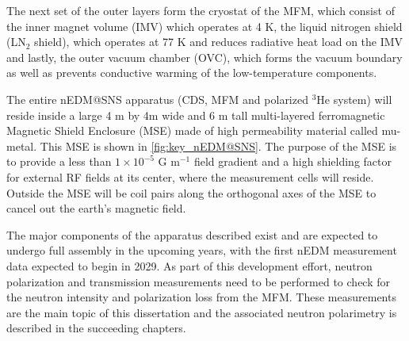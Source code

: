 
The next set of the outer layers form the cryostat of the MFM, which consist of the inner magnet volume (IMV) which operates at 4 K, the liquid nitrogen shield (LN$_2$ shield), which operates at 77 K and reduces radiative heat load on the IMV and lastly, the outer vacuum chamber (OVC), which forms the vacuum boundary as well as prevents conductive warming of the low-temperature components.

The entire nEDM@SNS apparatus (CDS, MFM and polarized $^3$He system) will reside inside a large 4 m by 4m wide and 6 m tall multi-layered ferromagnetic Magnetic Shield Enclosure (MSE) made of high permeability material called mu-metal. This MSE is shown in \cref{fig:key_nEDM@SNS}. The purpose of the MSE is to provide a less than $1\times 10^{-5}$ G m$^{-1}$ field gradient and a high shielding factor for external RF fields at its center, where the measurement cells will reside. Outside the MSE will be coil pairs along the orthogonal axes of the MSE to cancel out the earth’s magnetic field.

The major components of the apparatus described exist and are expected to undergo full assembly in the upcoming years, with the first nEDM measurement data expected to begin in 2029. As part of this development effort, neutron polarization and transmission measurements need to be performed to check for the neutron intensity and polarization loss from the MFM. These measurements are the main topic of this dissertation and the associated neutron polarimetry is described in the succeeding chapters.